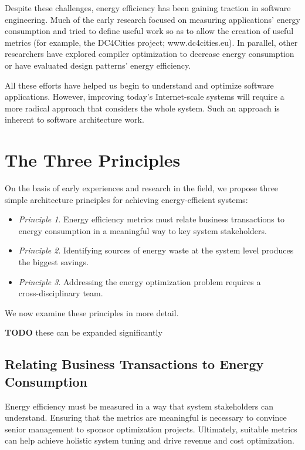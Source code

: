 Despite these challenges, energy efficiency has been gaining traction in software engineering. Much of the early research focused on measuring applications' energy consumption \cite{islam2016-energysoftwarefeatures} and tried to define useful work so as to allow the creation of useful metrics (for example, the DC4Cities project; www.dc4cities.eu). In parallel, other researchers have explored compiler optimization to decrease energy consumption or have evaluated design patterns' energy efficiency.

All these efforts have helped us begin to understand and optimize software applications. However, improving today's Internet-scale systems will require a more radical approach that considers the whole system. Such an approach is inherent to software architecture work.

\section{The Three Principles}

On the basis of early experiences and research in the field, we propose three simple architecture principles for achieving energy-efficient systems:

\begin{itemize}
\item \emph{Principle 1}. Energy efficiency metrics must relate business transactions to energy consumption in a meaningful way to key system stakeholders.
\item \emph{Principle 2}. Identifying sources of energy waste at the system level produces the biggest savings.
\item \emph{Principle 3}. Addressing the energy optimization problem requires a \\ cross-disciplinary team.
\end{itemize}

We now examine these principles in more detail.

\textbf{TODO} these can be expanded significantly

\subsection{Relating Business Transactions to Energy Consumption}

Energy efficiency must be measured in a way that system stakeholders can understand. Ensuring that the metrics are meaningful is necessary to convince senior management to sponsor optimization projects. Ultimately, suitable metrics can help achieve holistic system tuning and drive revenue and cost optimization.

